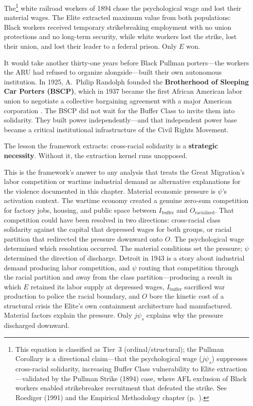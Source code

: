 The\footnote{This equation is classified as Tier~3 (ordinal/structural); the Pullman Corollary is a directional claim---that the psychological wage ($j\psi_s$) suppresses cross-racial solidarity, increasing Buffer Class vulnerability to Elite extraction---validated by the Pullman Strike (1894) case, where AFL exclusion of Black workers enabled strikebreaker recruitment that defeated the strike. See Roediger (1991) \cite{roediger} and the Empirical Methodology chapter (p.~\pageref{ch:empirical_methodology}).} white railroad workers of 1894 chose the psychological wage and lost their material wages. The Elite extracted maximum value from both populations: Black workers received temporary strikebreaking employment with no union protections and no long-term security, while white workers lost the strike, lost their union, and lost their leader to a federal prison. Only $E$ won.

It would take another thirty-one years before Black Pullman porters---the workers the ARU had refused to organize alongside---built their own autonomous institution. In 1925, A.\ Philip Randolph founded the \textbf{Brotherhood of Sleeping Car Porters (BSCP)}, which in 1937 became the first African American labor union to negotiate a collective bargaining agreement with a major American corporation \cite{bates_pullman}. The BSCP did not wait for the Buffer Class to invite them into solidarity. They built power independently---and that independent power base became a critical institutional infrastructure of the Civil Rights Movement.

The lesson the framework extracts: cross-racial solidarity is a \textbf{strategic necessity}. Without it, the extraction kernel runs unopposed.

This is the framework's answer to any analysis that treats the Great Migration's labor competition or wartime industrial demand as alternative explanations for the violence documented in this chapter. Material economic pressure is $\psi$'s activation context. The wartime economy created a genuine zero-sum competition for factory jobs, housing, and public space between $I_{\text{buffer}}$ and $O_{\text{racialized}}$. That competition could have been resolved in two directions: cross-racial class solidarity against the capital that depressed wages for both groups, or racial partition that redirected the pressure downward onto $O$. The psychological wage determined which resolution occurred. The material conditions set the pressure; $\psi$ determined the direction of discharge. Detroit in 1943 is a story about industrial demand producing labor competition, and $\psi$ routing that competition through the racial partition and away from the class partition---producing a result in which $E$ retained its labor supply at depressed wages, $I_{\text{buffer}}$ sacrificed war production to police the racial boundary, and $O$ bore the kinetic cost of a structural crisis the Elite's own containment architecture had manufactured. Material factors explain the pressure. Only $j\psi_s$ explains why the pressure discharged downward.

